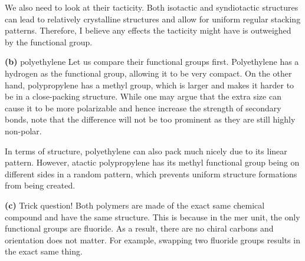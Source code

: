 \documentclass{article}
\begin{document}
    We also need to look at their tacticity. Both isotactic and syndiotactic structures can lead to relatively crystalline structures and allow for uniform regular stacking patterns. Therefore, I believe any effects the tacticity might have is outweighed by the functional group. 

    \textbf{(b)} $\boxed{\text{polyethylene}}$ Let us compare their functional groups first. Polyethylene has a hydrogen as the functional group, allowing it to be very compact. On the other hand, polypropylene has a methyl group, which is larger and makes it harder to be in a close-packing structure. While one may argue that the extra size can cause it to be more polarizable and hence increase the strength of secondary bonds, note that the difference will not be too prominent as they are still highly non-polar.

    In terms of structure, polyethylene can also pack much nicely due to its linear pattern. However, atactic polypropylene has its methyl functional group being on different sides in a random pattern, which prevents uniform structure formations from being created.

    \textbf{(c)} Trick question! Both polymers are made of the exact same chemical compound and have the same structure. This is because in the mer unit, the only functional groups are fluoride. As a result, there are no chiral carbons and orientation does not matter. For example, swapping two fluoride groups results in the exact same thing. 
\end{document}
